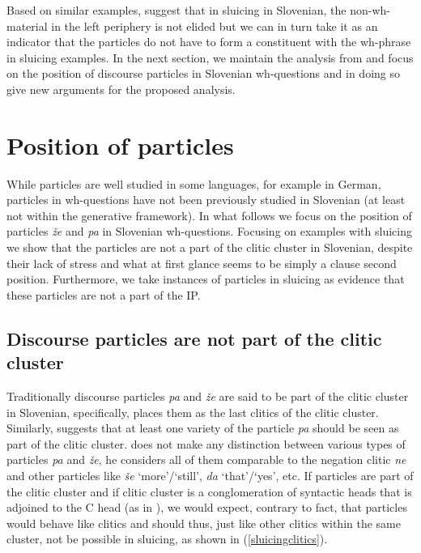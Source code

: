 \documentclass[output=paper,
modfonts,
newtxmath,
hidelinks
]{langscibook}
\begin{document}
\noindent Based on similar examples, \cite{marusicetal2015} suggest that in sluicing in Slovenian, the non-wh-material in the left periphery is not elided but we can in turn take it as an indicator that the particles do not have to form a constituent with the wh-phrase in sluicing examples. In the next section, we maintain the analysis from \cite{marusicetal2015} and focus on the position of discourse particles in Slovenian wh-questions and in doing so give new arguments for the proposed analysis.  

\section{Position of particles}\label{s4}

While particles are well studied in some languages, for example in German, particles in wh-questions have not been previously studied in Slovenian (at least not within the generative framework). In what follows we focus on the position of particles \textit{že} and \textit{pa} in Slovenian wh-questions. Focusing on examples with sluicing we show that the particles are not a part of the clitic cluster in Slovenian, despite their lack of stress and what at first glance seems to be simply a clause second position. Furthermore, we take instances of particles in sluicing as evidence that these particles are not a part of the IP.  

\subsection{Discourse particles are not part of the clitic cluster}

Traditionally discourse particles \textit{pa} and \textit{že} are said to be part of the clitic cluster in Slovenian, specifically, \cite{toporisic2000} places them as the last clitics of the clitic cluster. Similarly, \cite{oresnik1985naniz} suggests that at least one variety of the particle \textit{pa} should be seen as part of the clitic cluster. \cite{toporisic2000} does not make any distinction between various types of particles \textit{pa} and \textit{že}, he considers all of them comparable to the negation clitic \textit{ne} and other particles like \textit{še} `more'/`still', \textit{da} `that'/`yes', etc. If particles are part of the clitic cluster and if clitic cluster is a conglomeration of syntactic heads that is adjoined to the C head (as in \citealt{goldensheppard2000}), we would expect, contrary to fact, that particles would behave like clitics and should thus, just like other clitics within the same cluster, not be possible in sluicing, as shown in  (\ref{sluicingclitics}). 
\end{document}
